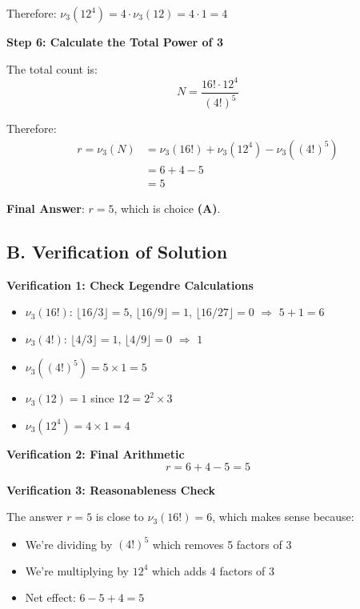 \documentclass[12pt]{article}
\begin{document}
\begin{solutionbox}
Therefore: $\nu_3(12^4) = 4 \cdot \nu_3(12) = 4 \cdot 1 = 4$

\vspace{0.3cm}

\textbf{Step 6: Calculate the Total Power of 3}

The total count is:
$$N = \frac{16! \cdot 12^4}{(4!)^5}$$

Therefore:
\begin{align*}
    r = \nu_3(N) &= \nu_3(16!) + \nu_3(12^4) - \nu_3((4!)^5) \\
    &= 6 + 4 - 5 \\
    &= 5
\end{align*}

\textbf{Final Answer}: $r = 5$, which is choice \textbf{(A)}.

\subsection*{B. Verification of Solution}

\textbf{Verification 1: Check Legendre Calculations}

\begin{itemize}
    \item $\nu_3(16!)$: $\lfloor 16/3 \rfloor = 5$, $\lfloor 16/9 \rfloor = 1$, $\lfloor 16/27 \rfloor = 0$ $\Rightarrow$ $5+1 = 6$ \checkmark
    \item $\nu_3(4!)$: $\lfloor 4/3 \rfloor = 1$, $\lfloor 4/9 \rfloor = 0$ $\Rightarrow$ $1$ \checkmark
    \item $\nu_3((4!)^5) = 5 \times 1 = 5$ \checkmark
    \item $\nu_3(12) = 1$ since $12 = 2^2 \times 3$ \checkmark
    \item $\nu_3(12^4) = 4 \times 1 = 4$ \checkmark
\end{itemize}

\textbf{Verification 2: Final Arithmetic}
$$r = 6 + 4 - 5 = 5$$ \checkmark

\textbf{Verification 3: Reasonableness Check}

The answer $r=5$ is close to $\nu_3(16!) = 6$, which makes sense because:
\begin{itemize}
    \item We're dividing by $(4!)^5$ which removes 5 factors of 3
    \item We're multiplying by $12^4$ which adds 4 factors of 3
    \item Net effect: $6 - 5 + 4 = 5$ \checkmark
\end{itemize}


\end{solutionbox}
\end{document}
